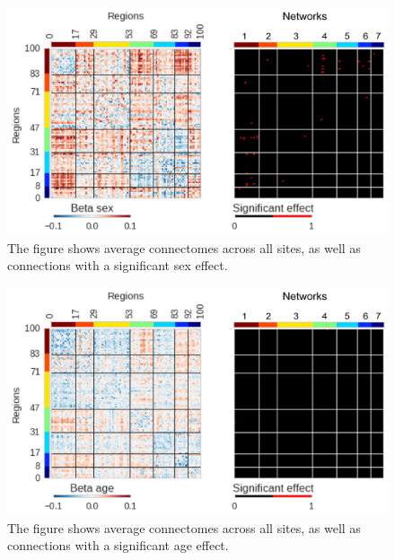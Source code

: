 \documentclass[authoryear]{elsarticle}
\begin{document}
\begin{figure}[htbp]
\begin{center}
\includegraphics[width=\linewidth]{../figures/effect_sex.png}
\end{center}
\caption[Connectome variability across sites]{
The figure shows average connectomes across all sites, as well as connections with a significant sex effect.
}
\label{fig_connectome_variability_sex}
\end{figure}

\begin{figure}[htbp]
\begin{center}
\includegraphics[width=\linewidth]{../figures/effect_age.png}
\end{center}
\caption[Connectome variability across sites]{
The figure shows average connectomes across all sites, as well as connections with a significant age effect.
}
\label{fig_connectome_variability_age}
\end{figure}
\end{document}
